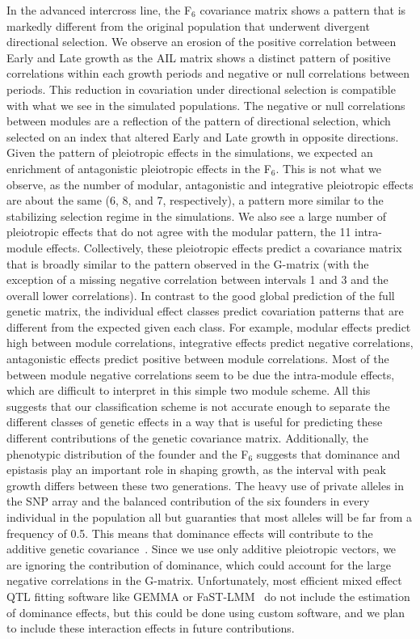 \begin{refsection}
In the advanced intercross line, the F$_{\text{6}}$ covariance
matrix shows a pattern that is markedly different from the original population
that underwent divergent directional selection. We
observe an erosion of the positive correlation between Early and Late growth
as the AIL matrix shows a distinct pattern of positive correlations within
each growth periods and negative or null correlations between periods. This
reduction in covariation under directional selection is compatible with what
we see in the simulated populations. The negative or null correlations between
modules are a reflection of the pattern of directional selection, which
selected on an index that altered Early and Late growth in opposite
directions. Given the pattern of pleiotropic effects in the simulations, we
expected an enrichment of antagonistic pleiotropic effects in the
F$_{\text{6}}$. This is not what we observe, as the number of modular,
antagonistic and integrative pleiotropic effects are about the same (6, 8, and
7, respectively), a pattern more similar to the stabilizing selection regime
in the simulations. We also see a large number of pleiotropic effects that do
not agree with the modular pattern, the 11 intra-module effects. Collectively,
these pleiotropic effects predict a covariance matrix that is broadly similar
to the pattern observed in the G-matrix (with the exception of a missing
negative correlation between intervals 1 and 3 and the overall lower
correlations). In contrast to the good global prediction of the full genetic
matrix, the individual effect classes predict covariation patterns that are
different from the expected given each class. For example, modular effects
predict high between module correlations, integrative effects predict negative
correlations, antagonistic effects predict positive between module
correlations. Most of the between module negative correlations seem to be due
the intra-module effects, which are difficult to interpret in this simple two
module scheme. All this suggests that our classification scheme is not
accurate enough to separate the different classes of genetic effects in a way
that is useful for predicting these different contributions of the genetic
covariance matrix. Additionally, the phenotypic distribution of the founder
and the F$_{\text{6}}$ suggests that dominance and epistasis play an important
role in shaping growth, as the interval with peak growth differs between these
two generations. The heavy use of private alleles in the SNP array and the
balanced contribution of the six founders in every individual in the
population all but guaranties that most alleles will be far from a frequency
of 0.5. This means that dominance effects will contribute to the additive
genetic covariance~\parencite{Falconer1978-kq, Lynch1998-ql}. Since we use
only additive pleiotropic vectors, we are ignoring the contribution of
dominance, which could account for the large negative correlations in the
G-matrix. Unfortunately, most efficient mixed effect QTL fitting software like
GEMMA or FaST-LMM~\parencite{Lippert2011-jn} do not include the estimation of
dominance effects, but this could be done using custom software, and we plan
to include these interaction effects in future contributions. 


\end{refsection}
